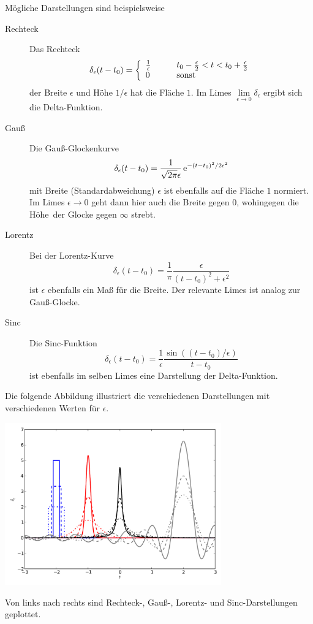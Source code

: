 \documentclass[paper=a4, fontsize=11.0pt, abstractoff, DIV12]{scrartcl}
\begin{document}
Mögliche Darstellungen sind beispielsweise
\begin{description}
    \item[Rechteck] Das Rechteck
    \begin{equation}
    \delta_\epsilon(t-t_0) = \left\{\begin{array}{l l}\frac{1}{\epsilon} & \qquad t_0-\frac{\epsilon}{2} < t < t_0+\frac{\epsilon}{2}\\ 0 &\qquad\mathrm{sonst}\end{array}\right.
    \end{equation}
    der Breite $\epsilon$ und Höhe $1/\epsilon$ hat die Fläche $1$. Im Limes
    $\lim\limits_{\epsilon\to0}\delta_\epsilon$ ergibt sich die
    Delta-Funktion.

    \item[Gauß] Die Gauß-Glockenkurve
    \begin{equation}
    \delta_\epsilon(t-t_0) = \frac{1}{\sqrt{2\pi}\epsilon} \,{\mathrm{e}}^{-(t-t_0)^2/2\epsilon^2}
    \end{equation}
    mit Breite (Standardabweichung) $\epsilon$ ist ebenfalls auf die Fläche
    $1$ normiert. Im Limes $\epsilon \to 0$ geht dann hier auch die Breite
    gegen $0$, wohingegen die \glqq Höhe\grqq~der Glocke gegen $\infty$
    strebt.
    \item[Lorentz] Bei der Lorentz-Kurve
    \begin{equation}
    \delta_\epsilon(t-t_0) = \frac{1}{\pi}\frac{\epsilon}{(t-t_0)^2 + \epsilon^2}
    \end{equation}
    ist $\epsilon$ ebenfalls ein Maß für die Breite. Der relevante Limes ist
    analog zur Gauß-Glocke.
    \item[Sinc] Die Sinc-Funktion
    \begin{equation}
    \delta_\epsilon(t-t_0) = \frac{1}{\epsilon} \frac{\sin((t-t_0)/\epsilon)}{t-t_0}
    \end{equation}
    ist ebenfalls im selben Limes eine Darstellung der Delta-Funktion.
\end{description}
    Die folgende Abbildung illustriert die verschiedenen Darstellungen
    mit verschiedenen Werten für $\epsilon$.
    \begin{center}
        \includegraphics[width=0.7\textwidth]{delta-plot.pdf}
    \end{center}
    Von links nach rechts sind Rechteck-, Gauß-, Lorentz- und
    Sinc-Darstellungen geplottet.
\end{document}
